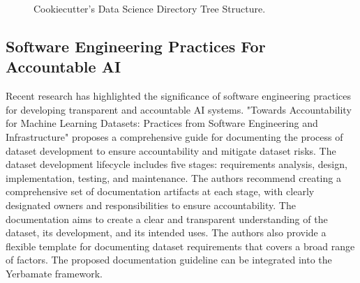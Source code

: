 \begin{figure}
    \centering
    \caption{Cookiecutter's Data Science Directory Tree Structure.}
    \label{fig:directory-tree}
\end{figure}



\subsection{Software Engineering Practices For Accountable AI}

Recent research has highlighted the significance of software engineering practices for developing transparent and accountable AI systems. "Towards Accountability for Machine Learning Datasets: Practices from Software Engineering and Infrastructure"\cite{accountabilityInAi} proposes a comprehensive guide for documenting the process of dataset development to ensure accountability and mitigate dataset risks. The dataset development lifecycle includes five stages: requirements analysis, design, implementation, testing, and maintenance. The authors recommend creating a comprehensive set of documentation artifacts at each stage, with clearly designated owners and responsibilities to ensure accountability. The documentation aims to create a clear and transparent understanding of the dataset, its development, and its intended uses. The authors also provide a flexible template for documenting dataset requirements that covers a broad range of factors. The proposed documentation guideline can be integrated into the Yerbamate framework.

